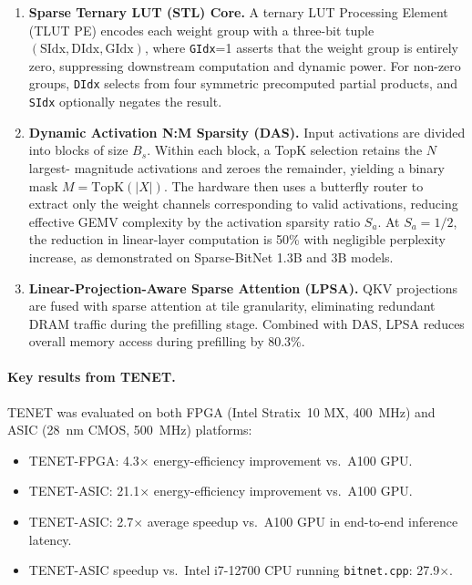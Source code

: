 \begin{enumerate}
  \item \textbf{Sparse Ternary LUT (STL) Core.}
        A ternary LUT Processing Element (TLUT PE) encodes each weight
        group with a three-bit tuple $(\text{SIdx}, \text{DIdx},
        \text{GIdx})$, where \texttt{GIdx}=1 asserts that the weight
        group is entirely zero, suppressing downstream computation and
        dynamic power.
        For non-zero groups, \texttt{DIdx} selects from four symmetric
        precomputed partial products, and \texttt{SIdx} optionally
        negates the result.

  \item \textbf{Dynamic Activation N:M Sparsity (DAS).}
        Input activations are divided into blocks of size $B_s$.
        Within each block, a TopK selection retains the $N$ largest-
        magnitude activations and zeroes the remainder, yielding a
        binary mask $M = \text{TopK}(|X|)$.
        The hardware then uses a butterfly router to extract only the
        weight channels corresponding to valid activations, reducing
        effective GEMV complexity by the activation sparsity ratio
        $S_a$.
        At $S_a = 1/2$, the reduction in linear-layer computation is 50\%
        with negligible perplexity increase, as demonstrated on
        Sparse-BitNet 1.3B and 3B models.

  \item \textbf{Linear-Projection-Aware Sparse Attention (LPSA).}
        QKV projections are fused with sparse attention at tile
        granularity, eliminating redundant DRAM traffic during the
        prefilling stage.
        Combined with DAS, LPSA reduces overall memory access during
        prefilling by 80.3\%.
\end{enumerate}

\paragraph{Key results from TENET.}
TENET was evaluated on both FPGA (Intel Stratix~10 MX, 400~MHz) and
ASIC (28~nm CMOS, 500~MHz) platforms:

\begin{itemize}
  \item TENET-FPGA: 4.3$\times$ energy-efficiency improvement vs.\ A100 GPU.
  \item TENET-ASIC: 21.1$\times$ energy-efficiency improvement vs.\ A100 GPU.
  \item TENET-ASIC: 2.7$\times$ average speedup vs.\ A100 GPU in end-to-end
        inference latency.
  \item TENET-ASIC speedup vs.\ Intel i7-12700 CPU
        running \texttt{bitnet.cpp}: 27.9$\times$.
\end{itemize}

